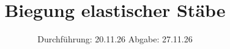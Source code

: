 


\subject{v103}
\title{Biegung elastischer Stäbe}
\date{%
  Durchführung: 20.11.26
  \hspace{3em}
  Abgabe: 27.11.26
}



\maketitle
\thispagestyle{empty}
\tableofcontents
\newpage






\printbibliography{}




